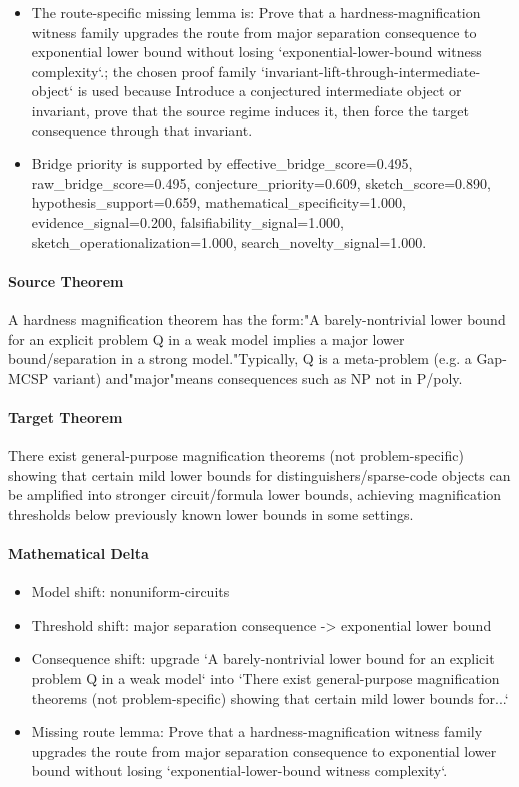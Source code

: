 \documentclass[11pt]{article}
\begin{document}
\begin{itemize}
\item The route-specific missing lemma is: Prove that a hardness-magnification witness family upgrades the route from major separation consequence to exponential lower bound without losing `exponential-lower-bound witness complexity`.; the chosen proof family `invariant-lift-through-intermediate-object` is used because Introduce a conjectured intermediate object or invariant, prove that the source regime induces it, then force the target consequence through that invariant.
\item Bridge priority is supported by effective\_bridge\_score=0.495, raw\_bridge\_score=0.495, conjecture\_priority=0.609, sketch\_score=0.890, hypothesis\_support=0.659, mathematical\_specificity=1.000, evidence\_signal=0.200, falsifiability\_signal=1.000, sketch\_operationalization=1.000, search\_novelty\_signal=1.000.
\end{itemize}
\paragraph{Source Theorem}
A hardness magnification theorem has the form:"A barely-nontrivial lower bound for an explicit problem Q in a weak model implies a major lower bound/separation in a strong model."Typically, Q is a meta-problem (e.g. a Gap-MCSP variant) and"major"means consequences such as NP not in P/poly.
\paragraph{Target Theorem}
There exist general-purpose magnification theorems (not problem-specific) showing that certain mild lower bounds for distinguishers/sparse-code objects can be amplified into stronger circuit/formula lower bounds, achieving magnification thresholds below previously known lower bounds in some settings.
\paragraph{Mathematical Delta}
\begin{itemize}
\item Model shift: nonuniform-circuits
\item Threshold shift: major separation consequence -> exponential lower bound
\item Consequence shift: upgrade `A barely-nontrivial lower bound for an explicit problem Q in a weak model` into `There exist general-purpose magnification theorems (not problem-specific) showing that certain mild lower bounds for...`
\item Missing route lemma: Prove that a hardness-magnification witness family upgrades the route from major separation consequence to exponential lower bound without losing `exponential-lower-bound witness complexity`.
\end{itemize}
\end{document}
